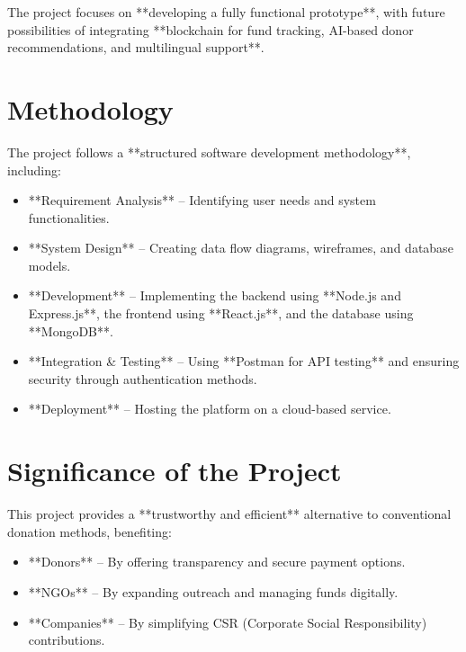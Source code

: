 The project focuses on **developing a fully functional prototype**, with future possibilities of integrating **blockchain for fund tracking, AI-based donor recommendations, and multilingual support**.

\section{Methodology}
The project follows a **structured software development methodology**, including:
\begin{itemize}
    \item **Requirement Analysis** – Identifying user needs and system functionalities.
    \item **System Design** – Creating data flow diagrams, wireframes, and database models.
    \item **Development** – Implementing the backend using **Node.js and Express.js**, the frontend using **React.js**, and the database using **MongoDB**.
    \item **Integration & Testing** – Using **Postman for API testing** and ensuring security through authentication methods.
    \item **Deployment** – Hosting the platform on a cloud-based service.
\end{itemize}

\section{Significance of the Project}
This project provides a **trustworthy and efficient** alternative to conventional donation methods, benefiting:
\begin{itemize}
    \item **Donors** – By offering transparency and secure payment options.
    \item **NGOs** – By expanding outreach and managing funds digitally.
    \item **Companies** – By simplifying CSR (Corporate Social Responsibility) contributions.
\end{itemize}

